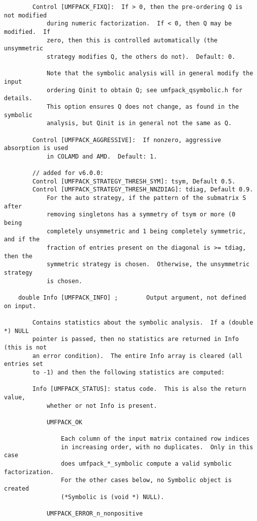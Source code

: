 \documentclass[11pt]{article}
\begin{document}
{\begin{verbatim}
        Control [UMFPACK_FIXQ]:  If > 0, then the pre-ordering Q is not modified
            during numeric factorization.  If < 0, then Q may be modified.  If
            zero, then this is controlled automatically (the unsymmetric
            strategy modifies Q, the others do not).  Default: 0.

            Note that the symbolic analysis will in general modify the input
            ordering Qinit to obtain Q; see umfpack_qsymbolic.h for details.
            This option ensures Q does not change, as found in the symbolic
            analysis, but Qinit is in general not the same as Q.

        Control [UMFPACK_AGGRESSIVE]:  If nonzero, aggressive absorption is used
            in COLAMD and AMD.  Default: 1.

        // added for v6.0.0:
        Control [UMFPACK_STRATEGY_THRESH_SYM]: tsym, Default 0.5.
        Control [UMFPACK_STRATEGY_THRESH_NNZDIAG]: tdiag, Default 0.9.
            For the auto strategy, if the pattern of the submatrix S after
            removing singletons has a symmetry of tsym or more (0 being
            completely unsymmetric and 1 being completely symmetric, and if the
            fraction of entries present on the diagonal is >= tdiag, then the
            symmetric strategy is chosen.  Otherwise, the unsymmetric strategy
            is chosen.

    double Info [UMFPACK_INFO] ;        Output argument, not defined on input.

        Contains statistics about the symbolic analysis.  If a (double *) NULL
        pointer is passed, then no statistics are returned in Info (this is not
        an error condition).  The entire Info array is cleared (all entries set
        to -1) and then the following statistics are computed:

        Info [UMFPACK_STATUS]: status code.  This is also the return value,
            whether or not Info is present.

            UMFPACK_OK

                Each column of the input matrix contained row indices
                in increasing order, with no duplicates.  Only in this case
                does umfpack_*_symbolic compute a valid symbolic factorization.
                For the other cases below, no Symbolic object is created
                (*Symbolic is (void *) NULL).

            UMFPACK_ERROR_n_nonpositive


\end{verbatim}}
\end{document}
